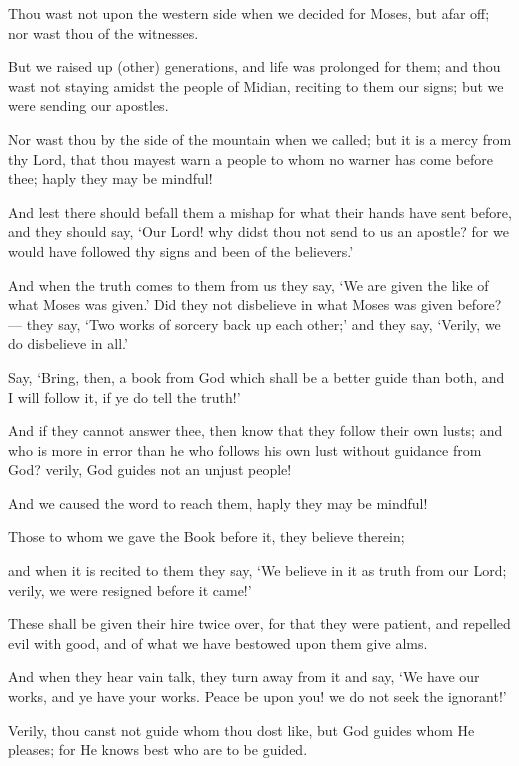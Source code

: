 \documentclass[fontsize=14pt, letterpaper, notitlepage, openany, DIV=12]{scrbook} %
\begin{document}
\noindent[28:44]
Thou wast not upon the western side when we decided for Moses, but afar off; nor wast
thou of the witnesses.

\noindent[28:45]
But we raised up (other) generations, and life was prolonged for them; and thou wast not
staying amidst the people of Midian, reciting to them our signs; but we were sending our
apostles.

\noindent[28:46]
Nor wast thou by the side of the mountain when we called; but it is a mercy from thy
Lord, that thou mayest warn a people to whom no warner has come before thee; haply they may
be mindful!

\noindent[28:47]
And lest there should befall them a mishap for what their hands have sent before, and
they should say, `Our Lord! why didst thou not send to us an apostle? for we would have
followed thy signs and been of the believers.'

\noindent[28:48]
And when the truth comes to them from us they say, `We are given the like of what
Moses was given.' Did they not disbelieve in what Moses was given before?--- they say, `Two
works of sorcery back up each other;' and they say, `Verily, we do disbelieve in all.'

\noindent[28:49]
Say, `Bring, then, a book from God which shall be a better guide than both, and I will
follow it, if ye do tell the truth!'

\noindent[28:50]
And if they cannot answer thee, then know that they follow their own lusts; and who is
more in error than he who follows his own lust without guidance from God? verily, God guides
not an unjust people!

\noindent[28:51]
And we caused the word to reach them, haply they may be mindful!

\noindent[28:52]
Those to whom we gave the Book before it, they believe therein;

\noindent[28:53]
and when it is recited to them they say, `We believe in it as truth from our Lord; verily,
we were resigned before it came!'

\noindent[28:54]
These shall be given their hire twice over, for that they were patient, and repelled evil
with good, and of what we have bestowed upon them give alms.

\noindent[28:55]
And when they hear vain talk, they turn away from it and say, `We have our works, and
ye have your works. Peace be upon you! we do not seek the ignorant!'

\noindent[28:56]
Verily, thou canst not guide whom thou dost like, but God guides whom He pleases; for
He knows best who are to be guided.
\end{document}
